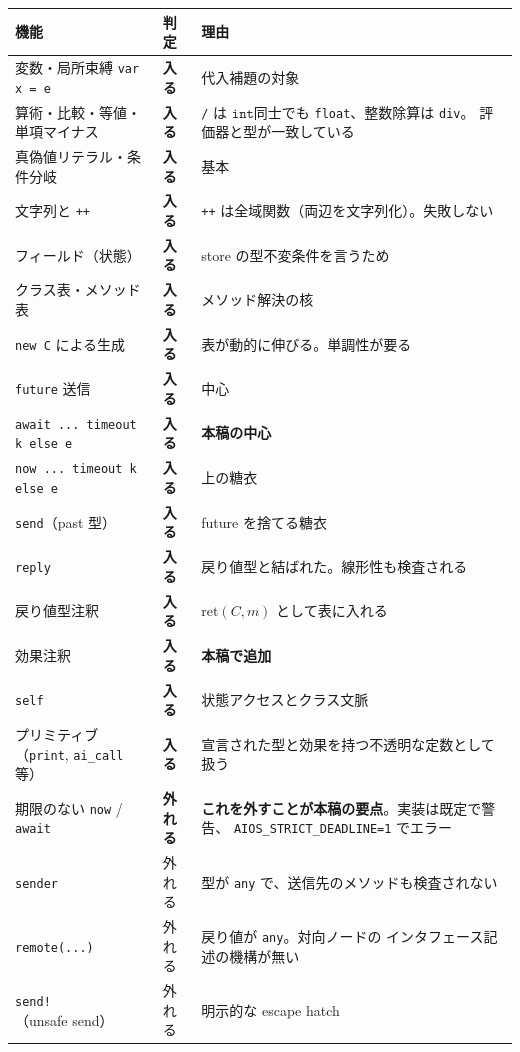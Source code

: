 \documentclass[11pt,a4paper]{ltjsarticle}
\theoremstyle{definition}
\theoremstyle{remark}
\newcommand{\tint}{\ensuremath{\mathtt{int}}}
\newcommand{\mret}{\mathrm{ret}}
\begin{document}
\begin{center}
\small
\begin{longtable}{@{}llp{7.0cm}@{}}
\toprule
機能 & 判定 & 理由 \\
\midrule
\endhead
変数・局所束縛 \texttt{var x = e} & \textbf{入る} & 代入補題の対象 \\
算術・比較・等値・単項マイナス & \textbf{入る} &
  \texttt{/} は \tint 同士でも \texttt{float}、整数除算は \texttt{div}。
  評価器と型が一致している \\
真偽値リテラル・条件分岐 & \textbf{入る} & 基本 \\
文字列と \texttt{++} & \textbf{入る} &
  \texttt{++} は全域関数（両辺を文字列化）。失敗しない \\
フィールド（状態） & \textbf{入る} & store の型不変条件を言うため \\
クラス表・メソッド表 & \textbf{入る} & メソッド解決の核 \\
\texttt{new C} による生成 & \textbf{入る} & 表が動的に伸びる。単調性が要る \\
\texttt{future} 送信 & \textbf{入る} & 中心 \\
\texttt{await ... timeout k else e} & \textbf{入る} & \textbf{本稿の中心} \\
\texttt{now ... timeout k else e} & \textbf{入る} & 上の糖衣 \\
\texttt{send}（past 型）& \textbf{入る} & future を捨てる糖衣 \\
\texttt{reply} & \textbf{入る} & 戻り値型と結ばれた。線形性も検査される \\
戻り値型注釈 & \textbf{入る} & $\mret(C,m)$ として表に入れる \\
効果注釈 & \textbf{入る} & \textbf{本稿で追加} \\
\texttt{self} & \textbf{入る} & 状態アクセスとクラス文脈 \\
プリミティブ（\texttt{print}, \texttt{ai\_call} 等）& \textbf{入る} &
  宣言された型と効果を持つ不透明な定数として扱う \\
\midrule
期限のない \texttt{now} / \texttt{await} & \textbf{外れる} &
  \textbf{これを外すことが本稿の要点}。実装は既定で警告、
  \texttt{AIOS\_STRICT\_DEADLINE=1} でエラー \\
\texttt{sender} & 外れる & 型が \texttt{any} で、送信先のメソッドも検査されない \\
\texttt{remote(...)} & 外れる & 戻り値が \texttt{any}。対向ノードの
  インタフェース記述の機構が無い \\
\texttt{send!}（unsafe send）& 外れる & 明示的な escape hatch \\

\end{longtable}
\end{center}
\end{document}
